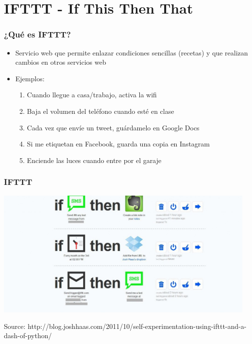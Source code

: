 

\section{IFTTT - If This Then That}



\begin{frame}
\frametitle{¿Qué es IFTTT?}

\begin{itemize}
   \item Servicio web que permite enlazar condiciones sencillas (recetas) y que realizan cambios en otros servicios web
   \item Ejemplos:
   \begin{enumerate}
     \item Cuando llegue a casa/trabajo, activa la wifi
     \item Baja el volumen del teléfono cuando esté en clase
     \item Cada vez que envíe un tweet, guárdamelo en Google Docs
     \item Si me etiquetan en Facebook, guarda una copia en Instagram
     \item Enciende las luces cuando entre por el garaje
   \end{enumerate}
\end{itemize}

\end{frame}



\begin{frame}
\frametitle{IFTTT}

\begin{center}
  \includegraphics[width=13cm]{figs/if-recipes.jpg}
\end{center}


\begin{flushright}
{\tiny
Source: http://blog.joshhaas.com/2011/10/self-experimentation-using-ifttt-and-a-dash-of-python/
}
\end{flushright}

\end{frame}



